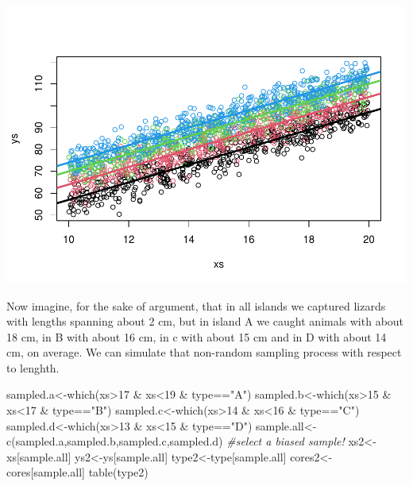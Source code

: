 \documentclass[
]{book}
\newenvironment{Shaded}{\begin{snugshade}}{\end{snugshade}}
\newcommand{\CommentTok}[1]{\textcolor[rgb]{0.56,0.35,0.01}{\textit{#1}}}
\newcommand{\DecValTok}[1]{\textcolor[rgb]{0.00,0.00,0.81}{#1}}
\newcommand{\FunctionTok}[1]{\textcolor[rgb]{0.00,0.00,0.00}{#1}}
\newcommand{\NormalTok}[1]{#1}
\newcommand{\OtherTok}[1]{\textcolor[rgb]{0.56,0.35,0.01}{#1}}
\newcommand{\SpecialCharTok}[1]{\textcolor[rgb]{0.00,0.00,0.00}{#1}}
\newcommand{\StringTok}[1]{\textcolor[rgb]{0.31,0.60,0.02}{#1}}
\begin{document}
\includegraphics{ECOMODbook_files/figure-latex/a10.9-1.pdf}

Now imagine, for the sake of argument, that in all islands we captured lizards with lengths spanning about 2 cm, but in island A we caught animals with about 18 cm, in B with about 16 cm, in c with about 15 cm and in D with about 14 cm, on average. We can simulate that non-random sampling process with respect to lenghth.

\begin{Shaded}
\begin{Highlighting}[]
\NormalTok{sampled.a}\OtherTok{\textless{}{-}}\FunctionTok{which}\NormalTok{(xs}\SpecialCharTok{\textgreater{}}\DecValTok{17} \SpecialCharTok{\&}\NormalTok{ xs}\SpecialCharTok{\textless{}}\DecValTok{19} \SpecialCharTok{\&}\NormalTok{ type}\SpecialCharTok{==}\StringTok{"A"}\NormalTok{)}
\NormalTok{sampled.b}\OtherTok{\textless{}{-}}\FunctionTok{which}\NormalTok{(xs}\SpecialCharTok{\textgreater{}}\DecValTok{15} \SpecialCharTok{\&}\NormalTok{ xs}\SpecialCharTok{\textless{}}\DecValTok{17} \SpecialCharTok{\&}\NormalTok{ type}\SpecialCharTok{==}\StringTok{"B"}\NormalTok{)}
\NormalTok{sampled.c}\OtherTok{\textless{}{-}}\FunctionTok{which}\NormalTok{(xs}\SpecialCharTok{\textgreater{}}\DecValTok{14} \SpecialCharTok{\&}\NormalTok{ xs}\SpecialCharTok{\textless{}}\DecValTok{16} \SpecialCharTok{\&}\NormalTok{ type}\SpecialCharTok{==}\StringTok{"C"}\NormalTok{)}
\NormalTok{sampled.d}\OtherTok{\textless{}{-}}\FunctionTok{which}\NormalTok{(xs}\SpecialCharTok{\textgreater{}}\DecValTok{13} \SpecialCharTok{\&}\NormalTok{ xs}\SpecialCharTok{\textless{}}\DecValTok{15} \SpecialCharTok{\&}\NormalTok{ type}\SpecialCharTok{==}\StringTok{"D"}\NormalTok{)}
\NormalTok{sample.all}\OtherTok{\textless{}{-}}\FunctionTok{c}\NormalTok{(sampled.a,sampled.b,sampled.c,sampled.d)}
\CommentTok{\#select a biased sample!}
\NormalTok{xs2}\OtherTok{\textless{}{-}}\NormalTok{xs[sample.all]}
\NormalTok{ys2}\OtherTok{\textless{}{-}}\NormalTok{ys[sample.all]}
\NormalTok{type2}\OtherTok{\textless{}{-}}\NormalTok{type[sample.all]}
\NormalTok{cores2}\OtherTok{\textless{}{-}}\NormalTok{cores[sample.all]}
\FunctionTok{table}\NormalTok{(type2)}
\end{Highlighting}
\end{Shaded}
\end{document}
